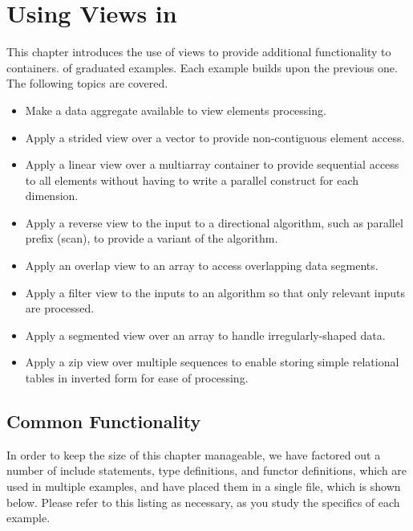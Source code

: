 \documentclass{report}
\begin{document}

\chapter{Using Views in \stapl\ }

This chapter introduces the use of views to provide additional
functionality to containers.
of graduated examples.  Each example builds upon the previous one.
The following topics are covered.

\begin{itemize}
\item
Make a data aggregate available to view elements processing.
\item
Apply a strided view over a vector to
provide non-contiguous element access.
\item
Apply a linear view over a multiarray container to
provide sequential access to all elements without having
to write a parallel construct for each dimension.
\item
Apply a reverse view to the input to a directional algorithm,
such as parallel prefix (scan), to provide a variant of the algorithm.
\item
Apply an overlap view to an array to access overlapping data segments.
\item
Apply a filter view to the inputs to an algorithm so that
only relevant inputs are processed.
\item
Apply a segmented view over an array to handle irregularly-shaped data.
\item
Apply a zip view over multiple sequences to enable storing simple
relational tables in inverted form for ease of processing.
\end{itemize}

\section{Common Functionality}

In order to keep the size of this chapter manageable, we have factored
out a number of include statements, type definitions, and functor
definitions, which are used in multiple examples, and have placed them
in a single file, which is shown below.  Please refer to this listing
as necessary, as you study the specifics of each example.



\end{document}

